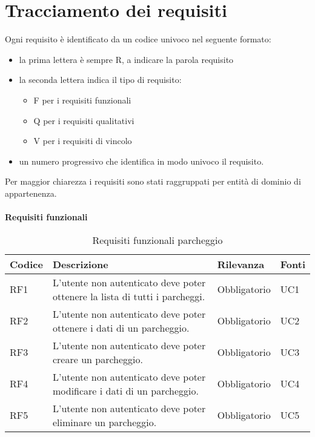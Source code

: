 \section{Tracciamento dei requisiti}
Ogni requisito è identificato da un codice univoco nel seguente formato:
\begin{itemize}
    \item la prima lettera è sempre R, a indicare la parola requisito
    \item la seconda lettera indica il tipo di requisito:
    \begin{itemize}
        \item F per i requisiti funzionali
        \item Q per i requisiti qualitativi
        \item V per i requisiti di vincolo
    \end{itemize}
    \item un numero progressivo che identifica in modo univoco il requisito.
\end{itemize}
Per maggior chiarezza i requisiti sono stati raggruppati per entità di dominio di appartenenza.
\\\\
\textbf{Requisiti funzionali}

\begin{table}[H]
    \begin{tabular}{|p{1cm}|p{6cm}|p{1.9cm}|p{1.8cm}|} 
    \hline
    Codice & Descrizione & Rilevanza &  Fonti \\ 
    \hline
    RF1 & L'utente non autenticato deve poter ottenere la lista di tutti i parcheggi. & Obbligatorio & UC1 \\ 
    \hline
    RF2 & L'utente non autenticato deve poter ottenere i dati di un parcheggio. & Obbligatorio & UC2 \\ 
    \hline
    RF3 & L'utente non autenticato deve poter creare un parcheggio. & Obbligatorio & UC3 \\ 
    \hline
    RF4 & L'utente non autenticato deve poter modificare i dati di un parcheggio. & Obbligatorio & UC4 \\
    \hline
    RF5 & L'utente non autenticato deve poter eliminare un parcheggio. & Obbligatorio & UC5 \\ 
    \hline
    \end{tabular}
    \caption{Requisiti funzionali parcheggio}
\end{table}


